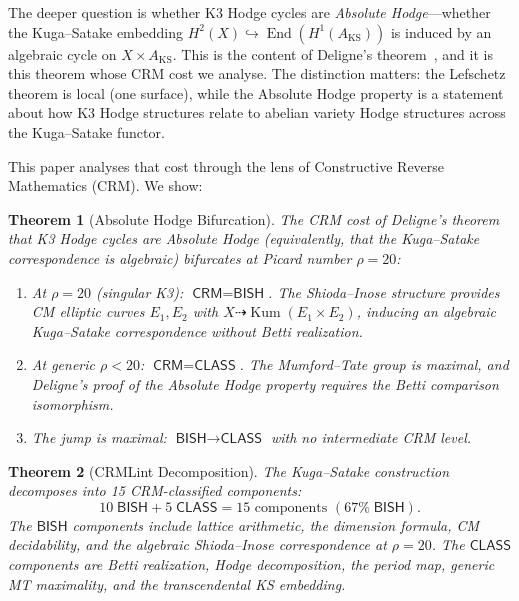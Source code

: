 \documentclass[11pt,a4paper]{article}
\theoremstyle{plain}
\newtheorem{theorem}{Theorem}[section]
\theoremstyle{definition}
\newcommand{\BISH}{\textsf{BISH}}
\newcommand{\CLASS}{\textsf{CLASS}}
\newcommand{\CRM}{\textsf{CRM}}
\DeclareMathOperator{\End}{End}
\DeclareMathOperator{\Kum}{Kum}
\begin{document}
The deeper question is whether K3 Hodge cycles are \emph{Absolute Hodge}---whether the Kuga--Satake embedding $H^2(X) \hookrightarrow \End(H^1(A_{\mathrm{KS}}))$ is induced by an algebraic cycle on $X \times A_{\mathrm{KS}}$. This is the content of Deligne's theorem~\cite{deligne-k3}, and it is this theorem whose CRM cost we analyse. The distinction matters: the Lefschetz theorem is local (one surface), while the Absolute Hodge property is a statement about how K3 Hodge structures relate to abelian variety Hodge structures across the Kuga--Satake functor.

This paper analyses that cost through the lens of Constructive Reverse Mathematics (CRM). We show:

\begin{theorem}[Absolute Hodge Bifurcation]\label{thm:A}
The CRM cost of Deligne's theorem that K3 Hodge cycles are Absolute Hodge (equivalently, that the Kuga--Satake correspondence is algebraic) bifurcates at Picard number $\rho = 20$:
\begin{enumerate}[label=(\alph*)]
  \item At $\rho = 20$ (singular K3): $\CRM = \BISH$. The Shioda--Inose structure provides CM elliptic curves $E_1, E_2$ with $X \dashrightarrow \Kum(E_1 \times E_2)$, inducing an algebraic Kuga--Satake correspondence without Betti realization.
  \item At generic $\rho < 20$: $\CRM = \CLASS$. The Mumford--Tate group is maximal, and Deligne's proof of the Absolute Hodge property requires the Betti comparison isomorphism.
  \item The jump is maximal: $\BISH \to \CLASS$ with no intermediate CRM level.
\end{enumerate}
\end{theorem}

\begin{theorem}[CRMLint Decomposition]\label{thm:B}
The Kuga--Satake construction decomposes into 15 CRM-classified components:
\[
10\;\BISH + 5\;\CLASS = 15 \text{ components } (67\%\;\BISH).
\]
The $\BISH$ components include lattice arithmetic, the dimension formula, CM decidability, and the algebraic Shioda--Inose correspondence at $\rho = 20$. The $\CLASS$ components are Betti realization, Hodge decomposition, the period map, generic MT maximality, and the transcendental KS embedding.
\end{theorem}
\end{document}
